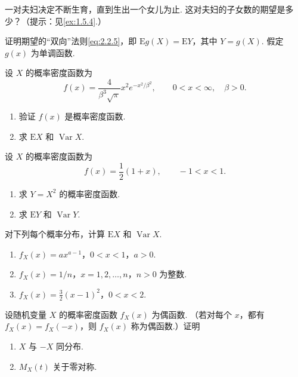 \begin{exercise}\label{exercise:2.20}
一对夫妇决定不断生育，直到生出一个女儿为止. 这对夫妇的子女数的期望是多少？（提示：见\autoref{ex:1.5.4}.）
\end{exercise}
\begin{exercise}\label{exercise:2.21}
证明期望的“双向”法则\eqref{eq:2.2.5}，即 $\mathrm Eg(X)=\mathrm EY$，其中 $Y=g(X)$. 假定 $g(x)$ 为单调函数.
\end{exercise}
\begin{exercise}\label{exercise:2.22}
设 $X$ 的概率密度函数为
$$f(x)=\frac4{\beta^3\sqrt\pi}x^2e^{-x^2/\beta^2},\qquad0<x<\infty,\quad\beta>0.$$
\begin{enumerate}
\item[(a)] 验证 $f(x)$ 是概率密度函数.
\item[(b)] 求 $\mathrm EX$ 和 $\operatorname{Var}X$.
\end{enumerate}
\end{exercise}
\begin{exercise}\label{exercise:2.23}
设 $X$ 的概率密度函数为
$$f(x)=\frac12(1+x),\qquad-1<x<1.$$
\begin{enumerate}
\item[(a)] 求 $Y=X^2$ 的概率密度函数.
\item[(b)] 求 $\mathrm EY$ 和 $\operatorname{Var}Y$.
\end{enumerate}
\end{exercise}
\begin{exercise}\label{exercise:2.24}
对下列每个概率分布，计算 $\mathrm EX$ 和 $\operatorname{Var}X$.
\begin{enumerate}
\item[(a)] $f_X(x)=ax^{a-1}$，$0<x<1$，$a>0$.
\item[(b)] $f_X(x)=1/n$，$x=1,2,\ldots,n$，$n>0$ 为整数.
\item[(c)] $f_X(x)=\frac32(x-1)^2$，$0<x<2$.
\end{enumerate}
\end{exercise}
\begin{exercise}\label{exercise:2.25}
设随机变量 $X$ 的概率密度函数 $f_X(x)$ 为偶函数. （若对每个 $x$，都有 $f_X(x)=f_X(-x)$，则 $f_X(x)$ 称为偶函数.）证明
\begin{enumerate}
\item[(a)] $X$ 与 $-X$ 同分布.
\item[(b)] $M_X(t)$ 关于零对称.
\end{enumerate}
\end{exercise}
